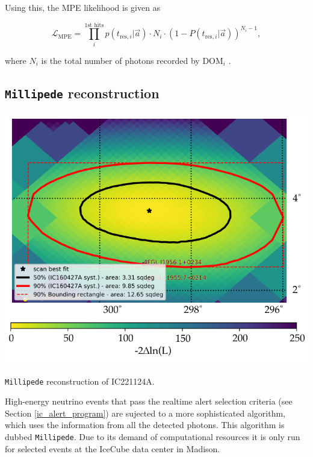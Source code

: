\documentclass[
    a4paper, %
    fontsize=10pt, %
    twoside=false, %
    numbers=noenddot, %
    fontmethod=tex,
]{kaobook}
\begin{document}
Using this, the MPE likelihood is given as

\begin{equation}
\mathcal{L}_\text{MPE} = \prod_i^\text{1st hits} p(t_{\text{res},i}|\vec{a}) \cdot N_i \cdot (1-P(t_{\text{res},i}|\vec{a}))^{N_i-1},
\end{equation}

where $N_i$ is the total number of photons recorded by $\text{DOM}_i$ \cite{Ahrens2004}.


\subsection{\texttt{Millipede} reconstruction} \label{millipede}

\begin{marginfigure}
    \includegraphics[width=1\textwidth]{ic/ic_millipede_IC221124A.pdf}
    \caption[\texttt{Millipede} reconstruction of IC221124A]{\texttt{Millipede} reconstruction of IC221124A.}
\end{marginfigure}

High-energy neutrino events that pass the realtime alert selection criteria (see Section \ref{ic_alert_program}) are sujected to a more sophisticated algorithm, which uses the information from all the detected photons. This algorithm is dubbed \texttt{Millipede}. Due to its demand of computational resources it is only run for selected events at the IceCube data center in Madison.
\end{document}

